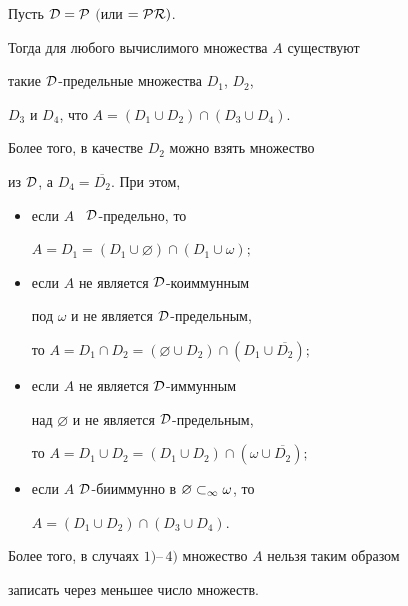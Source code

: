 \begin{thm}\label{th1}


Пусть $\cal{D}=\cal{P}$ $($или $=\cal{PR})$.


Тогда для любого вычислимого множества $A$ существуют


такие $\cal{D}$-предельные множества $D_1$, $D_2$,


$D_3$ и $D_4$, что $A=(D_1\cup D_2)\cap(D_3\cup D_4)$.


Более того, в качестве $D_2$ можно взять множество


из $\cal{D}$, а $D_4=\overline{D_2}$. При этом,


\begin{itemize}


\item[1)] если $A$ \ $\cal{D}$-предельно, то


$A=D_1=(D_1\cup\varnothing)\cap(D_1\cup\omega);$


\item[2)] если $A$ не является $\cal{D}$-коиммунным


под $\omega$ и не является $\cal{D}$-предельным,


то $A=D_1\cap D_2=(\varnothing\cup D_2)\cap(D_1\cup\overline{D_2});$


\item[3)] если $A$ не является $\cal{D}$-иммунным


над $\varnothing$ и не является $\cal{D}$-предельным,


то $A=D_1\cup D_2=(D_1\cup D_2)\cap(\omega\cup\overline{D_2});$


\item[4)] если $A$ $\cal{D}$-бииммунно в ${\varnothing}\subset_\infty{\omega}$, то


$A=(D_1\cup D_2)\cap(D_3\cup D_4)$.


\end{itemize}


Более того, в случаях $1)$--\,$4)$ множество $A$ нельзя таким образом


записать через меньшее число множеств.


\end{thm}





